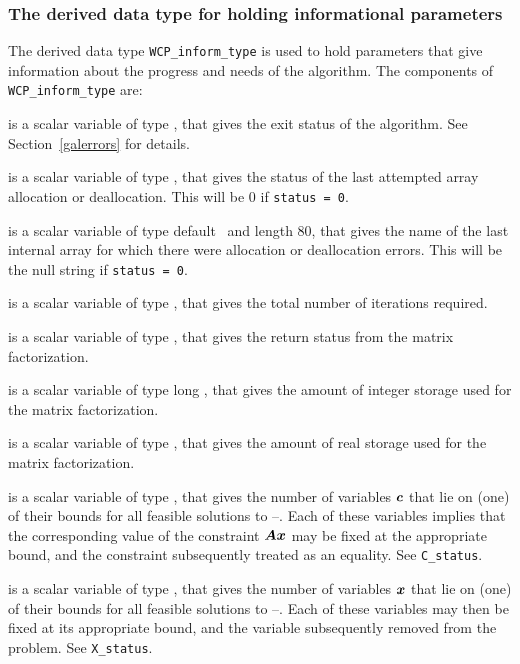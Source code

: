 \documentclass{galahad}
\newcommand{\packagename}{WCP}
\begin{document}

\subsubsection{The derived data type for holding informational
 parameters}\label{typeinform}
The derived data type 
{\tt \packagename\_inform\_type} 
is used to hold parameters that give information about the progress and needs 
of the algorithm. The components of 
{\tt \packagename\_inform\_type} 
are:

\begin{description}

 is a scalar variable of type \integer, that gives the
exit status of the algorithm. 
See Section~\ref{galerrors}
for details.

 is a scalar variable of type \integer, that gives
the status of the last attempted array allocation or deallocation.
This will be 0 if {\tt status = 0}.

 is a scalar variable of type default \character\
and length 80, that  gives the name of the last internal array 
for which there were allocation or deallocation errors.
This will be the null string if {\tt status = 0}. 

 is a scalar variable of type \integer, that gives the
total number of iterations required.

 is a scalar variable of type \integer, that 
gives the return status from the matrix factorization.

 is a scalar variable of type long
\integer, that gives the amount of integer storage used for the matrix 
factorization.

 is a scalar variable of type \longinteger, 
that gives the amount of real storage used for the matrix factorization.

 is a scalar variable of type \integer, that gives the
number of variables ${\bm{c}}$ that lie on (one) of their bounds for all
feasible solutions to \req{prim}--\req{boundary}. Each of these variables 
implies that the corresponding value of the constraint ${\bm{A}} {\bm{x}}$ may
be fixed at the appropriate bound, and the constraint subsequently treated as
an equality. See {\tt C\_status}.

 is a scalar variable of type \integer, that gives the
number of variables ${\bm{x}}$ that lie on (one) of their bounds for all
feasible solutions to \req{prim}--\req{boundary}. Each of these variables 
may then be fixed at its appropriate bound, and the variable subsequently
removed from the problem.
See {\tt X\_status}.


\end{description}
\end{document}
